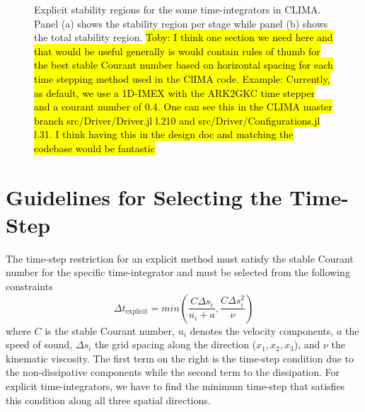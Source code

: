 \documentclass{report}
\newcommand{\hlc}[2][yellow]{ {\sethlcolor{#1} \hl{#2}} }
\begin{document}
\begin{figure}[htbp]
\begin{center}
\end{center}
\caption{Explicit stability regions for the some time-integrators in CLIMA. Panel (a) shows the stability region per stage while panel (b) shows the total stability region.
\hlc[green]{Toby: I think one section we need here and that would be useful generally is would contain rules of thumb for the best stable Courant number based on horizontal spacing for each time stepping method used in the ClIMA code. Example: Currently, as default, we use a 1D-IMEX with the ARK2GKC time stepper and a courant number of 0.4. One can see this in the CLIMA master branch src/Driver/Driver.jl l.210 and src/Driver/Configurations.jl l.31. I think having this in the design doc and matching the codebase would be fantastic}
}
\label{fig:time_integration/explicit_stability}
\end{figure}

\section{Guidelines for Selecting the Time-Step}
The time-step restriction for an explicit method must satisfy the stable Courant number for the specific time-integrator and must be selected from the following constraints
\[
\Delta t_{\mathrm{explicit}} = min \left( \frac{C \Delta s_i}{u_i + a}, \frac{C \Delta s_i^2}{\nu} \right)
\]
where $C$ is the stable Courant number, $u_i$ denotes the velocity components, $a$ the speed of sound, $\Delta s_i$ the grid spacing along the direction ($x_1,x_2,x_3$), and $\nu$ the kinematic viscosity. The first term on the right is the time-step condition due to the non-dissipative components while the second term to the dissipation. For explicit time-integrators, we have to find the minimum time-step that satisfies this condition along all three spatial directions.
\end{document}
